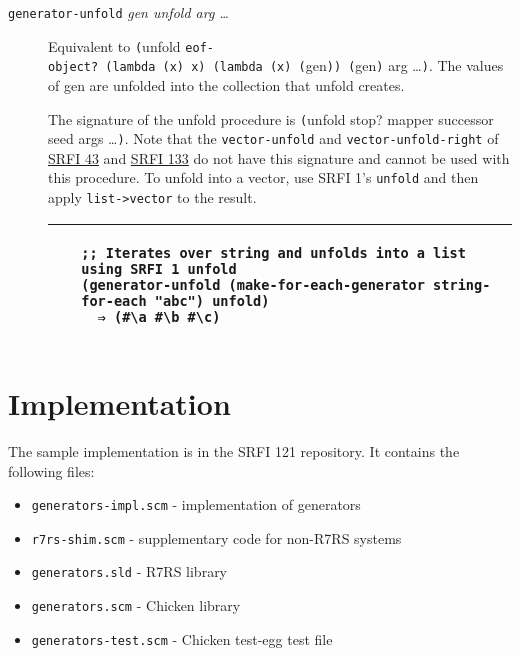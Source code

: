 \begin{description}
\item[\texttt{generator-unfold} \emph{gen unfold arg \ldots{}}]
Equivalent to \texttt{(}unfold
\texttt{eof-object?\ (lambda\ (x)\ x)\ (lambda\ (x)\ (}gen\texttt{))\ (}gen\texttt{)}
arg \ldots{}\texttt{)}. The values of gen are unfolded into the
collection that unfold creates.

The signature of the unfold procedure is \texttt{(}unfold stop? mapper
successor seed args \ldots{}\texttt{)}. Note that the
\texttt{vector-unfold} and \texttt{vector-unfold-right} of
\href{http://srfi.schemers.org/srfi-43/srfi-43.html}{SRFI 43} and
\href{http://srfi.schemers.org/srfi-133/srfi-133.html}{SRFI 133} do not
have this signature and cannot be used with this procedure. To unfold
into a vector, use SRFI 1's \texttt{unfold} and then apply
\texttt{list-\textgreater{}vector} to the result.

\begin{longtable}[]{@{}ll@{}}
\toprule
\begin{minipage}[t]{0.47\columnwidth}\raggedright\strut
~\strut
\end{minipage} & \begin{minipage}[t]{0.47\columnwidth}\raggedright\strut
\begin{verbatim}
;; Iterates over string and unfolds into a list using SRFI 1 unfold
(generator-unfold (make-for-each-generator string-for-each "abc") unfold)
  ⇒ (#\a #\b #\c)
\end{verbatim}
\strut
\end{minipage}\tabularnewline
\bottomrule
\end{longtable}
\end{description}

\section{Implementation}\label{implementation}

The sample implementation is in the SRFI 121 repository. It contains the
following files:

\begin{itemize}
\tightlist
\item
  \texttt{generators-impl.scm} - implementation of generators
\item
  \texttt{r7rs-shim.scm} - supplementary code for non-R7RS systems
\item
  \texttt{generators.sld} - R7RS library
\item
  \texttt{generators.scm} - Chicken library
\item
  \texttt{generators-test.scm} - Chicken test-egg test file
\end{itemize}

